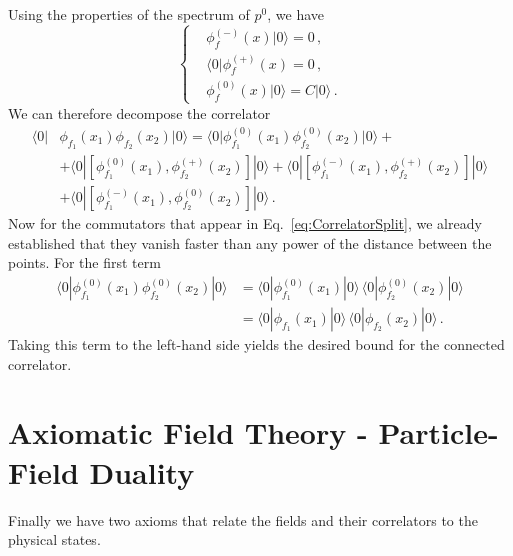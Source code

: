 Using the properties of the spectrum of $p^0$, we have
\begin{equation}
    \label{eq:FieldsAndSpectrum}
    \begin{cases}
        &\phi_f^{(-)}(x) |0\rangle = 0 \, , \\        
        &\langle 0 | \phi_f^{(+)}(x) = 0 \, , \\
        & \phi_f^{(0)}(x) |0\rangle = C |0\rangle\, .
    \end{cases}
\end{equation}
We can therefore decompose the correlator
\begin{equation}
    \label{eq:CorrelatorSplit}
    \begin{split}
        \langle 0 | &\phi_{f_1}(x_1) \phi_{f_2}(x_2) | 0\rangle = 
            \langle 0 | \phi_{f_1}^{(0)}(x_1) \phi_{f_2}^{(0)}(x_2) | 0\rangle + \\
        & + \langle 0 | \left[\phi_{f_1}^{(0)}(x_1), \phi_{f_2}^{(+)}(x_2)      \right] | 0\rangle 
        + \langle 0 | \left[\phi_{f_1}^{(-)}(x_1), \phi_{f_2}^{(+)}(x_2)\right] | 0\rangle \\
        & + \langle 0 | \left[\phi_{f_1}^{(-)}(x_1), \phi_{f_2}^{(0)}(x_2)  \right] | 0\rangle \, .
    \end{split}
\end{equation}
Now for the commutators that appear in Eq.~\eqref{eq:CorrelatorSplit}, we
already established that they vanish faster than any power of the distance
between the points. For the first term
\begin{align}
    \langle 0 | \phi_{f_1}^{(0)}(x_1) \phi_{f_2}^{(0)}(x_2) | 0\rangle 
    &= \langle 0 | \phi_{f_1}^{(0)}(x_1) | 0\rangle\, 
        \langle 0 | \phi_{f_2}^{(0)}(x_2) | 0\rangle \\
    &=  \langle 0 | \phi_{f_1}(x_1) | 0\rangle\, 
    \langle 0 | \phi_{f_2}(x_2) | 0\rangle \, .
\end{align}
Taking this term to the left-hand side yields the desired bound for the
connected correlator. 

\section{Axiomatic Field Theory - Particle-Field Duality}
\label{sec:PartFieldDual}

Finally we have two axioms that relate the fields and their correlators to the
physical states. 

